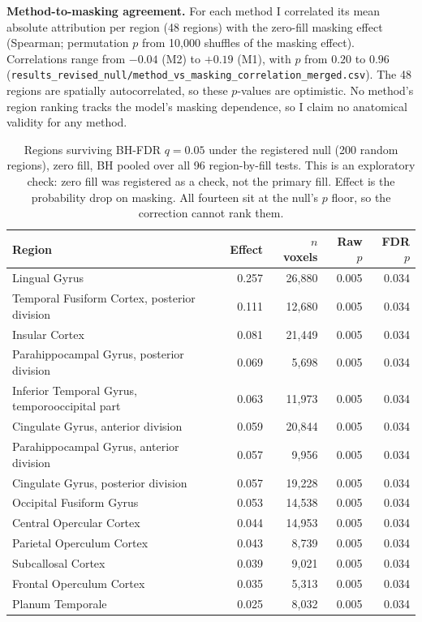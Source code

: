 \documentclass[11pt]{article}
\begin{document}
\textbf{Method-to-masking agreement.} For each method I correlated its mean absolute attribution per region
(48 regions) with the zero-fill masking effect (Spearman; permutation $p$ from 10{,}000 shuffles of the masking
effect). Correlations range from $-0.04$ (M2) to $+0.19$ (M1), with $p$ from $0.20$ to $0.96$
(\texttt{results\_}\allowbreak\texttt{revised\_null/method\_vs\_masking\_correlation\_merged.csv}). The 48 regions are
spatially autocorrelated, so these $p$-values are optimistic. No method's region ranking tracks the model's masking
dependence, so I claim no anatomical validity for any method.

\begin{table}[H]
\centering
\caption{Regions surviving BH-FDR $q=0.05$ under the registered null (200 random regions), zero fill, BH pooled over all 96 region-by-fill tests. This is an
exploratory check: zero fill was registered as a check, not the primary fill. Effect is the probability drop on
masking. All fourteen sit at the null's $p$ floor, so the correction cannot rank them.}
\label{tab:registered}
\small
\begin{tabular}{lrrrr}
\toprule
Region & Effect & $n$ voxels & Raw $p$ & FDR $p$ \\
\midrule
Lingual Gyrus & 0.257 & 26{,}880 & 0.005 & 0.034 \\
Temporal Fusiform Cortex{,} posterior division & 0.111 & 12{,}680 & 0.005 & 0.034 \\
Insular Cortex & 0.081 & 21{,}449 & 0.005 & 0.034 \\
Parahippocampal Gyrus{,} posterior division & 0.069 & 5{,}698 & 0.005 & 0.034 \\
Inferior Temporal Gyrus{,} temporooccipital part & 0.063 & 11{,}973 & 0.005 & 0.034 \\
Cingulate Gyrus{,} anterior division & 0.059 & 20{,}844 & 0.005 & 0.034 \\
Parahippocampal Gyrus{,} anterior division & 0.057 & 9{,}956 & 0.005 & 0.034 \\
Cingulate Gyrus{,} posterior division & 0.057 & 19{,}228 & 0.005 & 0.034 \\
Occipital Fusiform Gyrus & 0.053 & 14{,}538 & 0.005 & 0.034 \\
Central Opercular Cortex & 0.044 & 14{,}953 & 0.005 & 0.034 \\
Parietal Operculum Cortex & 0.043 & 8{,}739 & 0.005 & 0.034 \\
Subcallosal Cortex & 0.039 & 9{,}021 & 0.005 & 0.034 \\
Frontal Operculum Cortex & 0.035 & 5{,}313 & 0.005 & 0.034 \\
Planum Temporale & 0.025 & 8{,}032 & 0.005 & 0.034 \\
\bottomrule
\end{tabular}
\end{table}
\end{document}

